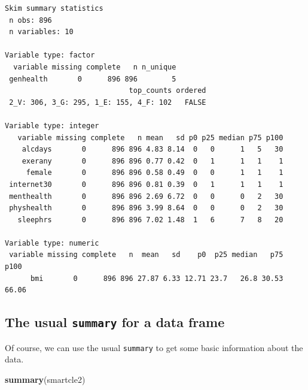 \documentclass[]{book}
\newenvironment{Shaded}{\begin{snugshade}}{\end{snugshade}}
\newcommand{\KeywordTok}[1]{\textcolor[rgb]{0.13,0.29,0.53}{\textbf{#1}}}
\newcommand{\NormalTok}[1]{#1}
\theoremstyle{definition}
\theoremstyle{definition}
\theoremstyle{definition}
\theoremstyle{remark}
\begin{document}
\begin{verbatim}
Skim summary statistics
 n obs: 896 
 n variables: 10 

Variable type: factor 
  variable missing complete   n n_unique
 genhealth       0      896 896        5
                             top_counts ordered
 2_V: 306, 3_G: 295, 1_E: 155, 4_F: 102   FALSE

Variable type: integer 
   variable missing complete   n mean   sd p0 p25 median p75 p100
    alcdays       0      896 896 4.83 8.14  0   0      1   5   30
    exerany       0      896 896 0.77 0.42  0   1      1   1    1
     female       0      896 896 0.58 0.49  0   0      1   1    1
 internet30       0      896 896 0.81 0.39  0   1      1   1    1
 menthealth       0      896 896 2.69 6.72  0   0      0   2   30
 physhealth       0      896 896 3.99 8.64  0   0      0   2   30
   sleephrs       0      896 896 7.02 1.48  1   6      7   8   20

Variable type: numeric 
 variable missing complete   n  mean   sd    p0  p25 median   p75  p100
      bmi       0      896 896 27.87 6.33 12.71 23.7   26.8 30.53 66.06
\end{verbatim}

\subsection{\texorpdfstring{The usual \texttt{summary} for a data
frame}{The usual summary for a data frame}}\label{the-usual-summary-for-a-data-frame}

Of course, we can use the usual \texttt{summary} to get some basic
information about the data.

\begin{Shaded}
\begin{Highlighting}[]
\KeywordTok{summary}\NormalTok{(smartcle2)}
\end{Highlighting}
\end{Shaded}
\end{document}
